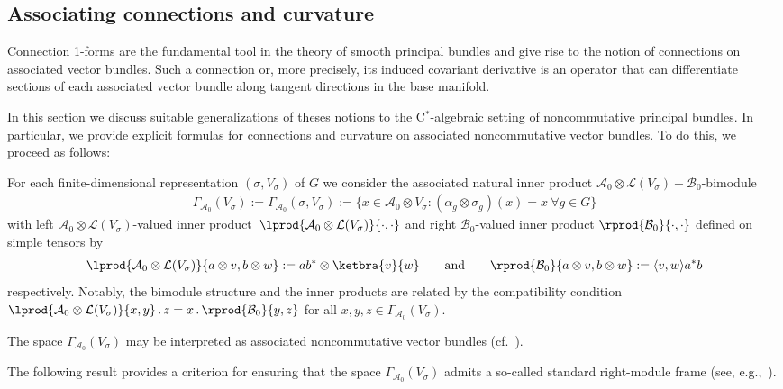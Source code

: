 \documentclass[10pt,a4paper]{amsart}
\numberwithin{equation}{section}
\newcommand*{\tensor}{\otimes}		%
\newcommand*{\Star}{$^*$\nobreakdash}
\newcommand*{\acts}{\,.\,}
\newcommand*{\alg}{\mathcal}		%
\newcommand*{\aA}{\alg{A}}			%
\newcommand*{\aB}{\alg{B}} 			%
\newcommand*{\End}{\mathcal{L}} %
\begin{document}
\subsection{Associating connections and curvature}\label{sec:infobj}

Connection 1-forms are the fundamental tool in the theory of smooth principal bundles and give rise to the notion of connections on associated vector bundles.
Such a connection or, more precisely, its induced covariant derivative is an operator that can differentiate sections of each associated vector bundle along tangent directions in the base manifold.
	
In this section we discuss suitable generalizations of theses notions to the C\Star-algebraic setting of noncommutative principal bundles.
In particular, we provide explicit formulas for connections and curvature on associated noncommutative vector bundles.
To do this, we proceed as follows:

For each finite-dimensional representation $(\sigma,V_\sigma)$ of $G$ we consider the associated natural inner product $\aA_0 \tensor \End(V_\sigma)-\aB_0$-bimodule
\begin{gather*}
\Gamma_{\aA_0}(V_\sigma) := \Gamma_{\aA_0}(\sigma,V_\sigma) := \{ x \in \aA_0 \tensor V_\sigma\colon (\alpha_g \tensor \sigma_g)(x) = x \ \forall g\in G\}%
	\end{gather*}
	with left $\aA_0 \tensor \End(V_\sigma)$-valued inner product~$\lprod{\aA_0 \tensor \End(V_\sigma)}{\cdot,\cdot}$ and right $\aB_0$-valued inner product $\rprod{\aB_0}{\cdot,\cdot}$
	defined on simple tensors by
	\begin{gather*}
		\lprod{\aA_0 \tensor \End(V_\sigma)}{a \tensor v, b \tensor w} := ab^* \tensor \ketbra{v}{w} \qquad \text{and} \qquad \rprod{\aB_0}{a \tensor v, b \tensor w} := \langle v,w \rangle a^*b %
	\end{gather*}
	respectively. Notably, the bimodule structure and the inner products are related by the compatibility condition $\lprod{\aA_0 \tensor \End(V_\sigma)}{x,y} \acts z = x \acts \rprod{\aB_0}{y,z}$ for all $x,y,z \in \Gamma_{\aA_0}(V_\sigma)$.
	
\begin{Remark}The space $\Gamma_{\aA_0}(V_\sigma)$ may be interpreted as associated noncommutative vector bundles (cf.~\cite{Wa12M}).
\end{Remark}

The following result provides a criterion for ensuring that the space $\Gamma_{\aA_0}(V_\sigma)$ admits a so-called standard right-module frame (see, e.g.,~\cite[Section~2]{Rieffel08}).
\end{document}
